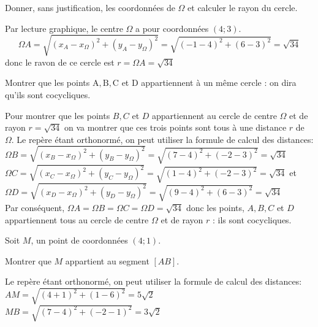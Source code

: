 \documentclass[11pt,a4paper]{article}  %
\begin{document}
\begin{enumMet}
\begin{corrBox}
	\end{corrBox}
	\item Donner, sans justification, les coordonnées de $\Omega$ et calculer le rayon du cercle.\\
	\begin{corrBox}
		Par lecture graphique, le centre $\Omega$ a pour coordonnées $(4 ; 3)$. 
		$$
		\Omega A=\sqrt{\left(x_{A}-x_{\Omega}\right)^{2}+\left(y_{A}-y_{\Omega}\right)^{2}}=\sqrt{(-1-4)^{2}+(6-3)^{2}}=\sqrt{34}
		$$
		donc le ravon de ce cercle est $r=\Omega A=\sqrt{34}$
	\end{corrBox}
	\item  Montrer que les points $\mathrm{A}, \mathrm{B}, \mathrm{C}$ et $\mathrm{D}$ appartiennent à un même cercle : on dira qu'ils sont cocycliques.\\
	\begin{corrBox}
		Pour montrer que les points $B, C$ et $D$ appartiennent au cercle de centre $\Omega$ et de rayon $r=\sqrt{34}$ on va montrer que ces trois points sont tous à une distance $r$ de $\Omega$. Le repère étant orthonormé, on peut utiliser la formule de calcul des distances:\\
		$\Omega B=\sqrt{\left(x_{B}-x_{\Omega}\right)^{2}+\left(y_{B}-y_{\Omega}\right)^{2}}=\sqrt{(7-4)^{2}+(-2-3)^{2}}=\sqrt{34}$\\
		$\Omega C=\sqrt{\left(x_{C}-x_{\Omega}\right)^{2}+\left(y_{C}-y_{\Omega}\right)^{2}}=\sqrt{(1-4)^{2}+(-2-3)^{2}}=\sqrt{34}$ et\\
		$\Omega D=\sqrt{\left(x_{D}-x_{\Omega}\right)^{2}+\left(y_{D}-y_{\Omega}\right)^{2}}=\sqrt{(9-4)^{2}+(6-3)^{2}}=\sqrt{34}$\\
		Par conséquent, $\Omega A=\Omega B=\Omega C=\Omega D=\sqrt{34}$ donc les points, $A, B, C$ et $D$ appartiennent tous au cercle de centre $\Omega$ et de rayon $r$ : ils sont cocycliques.
	\end{corrBox}
	\item Soit $M$, un point de coordonnées $(4 ; 1)$.
	\begin{enumMet}
		\item Montrer que $M$ appartient au segment $[A B]$.\\
		\begin{corrBox}
			Le repère étant orthonormé, on peut utiliser la formule de calcul des distances:\\
			$A M=\sqrt{(4+1)^{2}+(1-6)^{2}}=5 \sqrt{2}$\\
			$M B=\sqrt{(7-4)^{2}+(-2-1)^{2}}=3 \sqrt{2}$\\

\end{corrBox}
\end{enumMet}
\end{enumMet}
\end{document}
